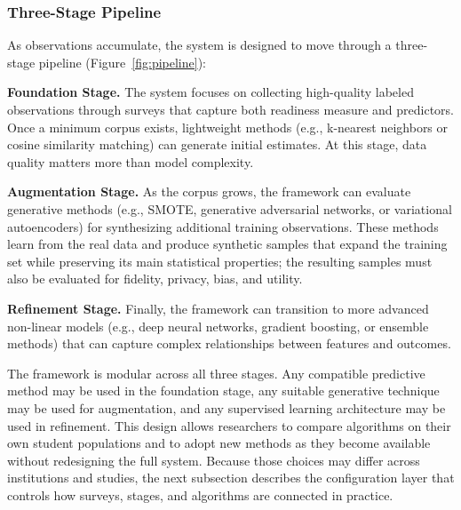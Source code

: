 \documentclass[letterpaper,11pt]{article}
\begin{document}
\subsubsection{Three-Stage Pipeline}

As observations accumulate, the system is designed to move through a three-stage pipeline (Figure~\ref{fig:pipeline}):

\textbf{Foundation Stage.} The system focuses on collecting high-quality labeled observations through surveys that capture both readiness measure and predictors. Once a minimum corpus exists, lightweight methods (e.g., k-nearest neighbors or cosine similarity matching) can generate initial estimates. At this stage, data quality matters more than model complexity.

\textbf{Augmentation Stage.} As the corpus grows, the framework can evaluate generative methods (e.g., SMOTE, generative adversarial networks, or variational autoencoders) for synthesizing additional training observations. These methods learn from the real data and produce synthetic samples that expand the training set while preserving its main statistical properties; the resulting samples must also be evaluated for fidelity, privacy, bias, and utility.

\textbf{Refinement Stage.} Finally, the framework can transition to more advanced non-linear models (e.g., deep neural networks, gradient boosting, or ensemble methods) that can capture complex relationships between features and outcomes.

The framework is modular across all three stages. Any compatible predictive method may be used in the foundation stage, any suitable generative technique may be used for augmentation, and any supervised learning architecture may be used in refinement. This design allows researchers to compare algorithms on their own student populations and to adopt new methods as they become available without redesigning the full system. Because those choices may differ across institutions and studies, the next subsection describes the configuration layer that controls how surveys, stages, and algorithms are connected in practice.
\end{document}
